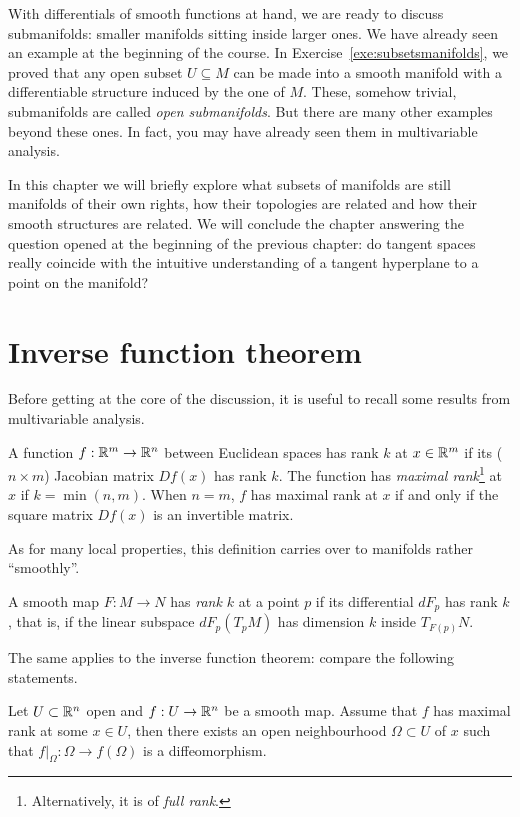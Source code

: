 With differentials of smooth functions at hand, we are ready to discuss submanifolds: smaller manifolds sitting inside larger ones.
We have already seen an example at the beginning of the course.
In Exercise~\ref{exe:subsetsmanifolds}, we proved that any open subset $U\subseteq M$ can be made into a smooth manifold with a differentiable structure induced by the one of $M$.
These, somehow trivial, submanifolds are called \emph{open submanifolds}.
But there are many other examples beyond these ones.
In fact, you may have already seen them in multivariable analysis.

In this chapter we will briefly explore what subsets of manifolds are still manifolds of their own rights, how their topologies are related and how their smooth structures are related.
We will conclude the chapter answering the question opened at the beginning of the previous chapter: do tangent spaces really coincide with the intuitive understanding of a tangent hyperplane to a point on the manifold?

\section{Inverse function theorem}

Before getting at the core of the discussion, it is useful to
recall some results from multivariable analysis.

A function $f:\mathbb{R}^m \to \mathbb{R}^n$ between Euclidean spaces has rank $k$ at $x\in\mathbb{R}^m$ if its ($n\times m$) Jacobian matrix $Df(x)$ has rank $k$.
The function has \emph{maximal rank}\footnote{Alternatively, it is of \emph{full rank}.} at $x$ if $k = \min(n,m)$.
When $n=m$, $f$ has maximal rank at $x$ if and only if the square matrix $Df(x)$ is an invertible matrix.

As for many local properties, this definition carries over to manifolds rather ``smoothly''.
%
\begin{definition}
	A smooth map $F:M\to N$ has \emph{rank $k$} at a point $p$ if its differential $dF_p$ has rank $k$, that is, if the linear subspace $dF_p(T_pM)$ has dimension $k$ inside $T_{F(p)}N$.
\end{definition}
%
The same applies to the inverse function theorem:
compare the following statements.
%
\begin{theorem}\label{thm:ift}
	Let $U\subset\mathbb{R}^n$ open and $f:U \to \mathbb{R}^n$ be a smooth map.
	Assume that $f$ has maximal rank at some $x\in U$, then there exists an open neighbourhood $\Omega\subset U$ of $x$ such that  $f\big|_\Omega : \Omega \to f(\Omega)$ is a diffeomorphism.
\end{theorem}

